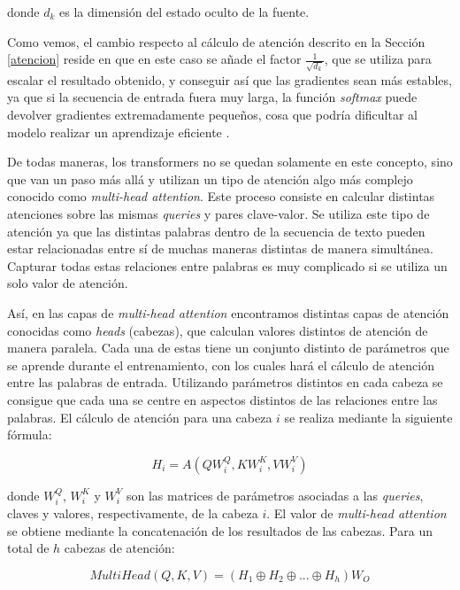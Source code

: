 \documentclass[11pt,spanish,listoffigures,listoftables]{tfgetsinf}
\begin{document}
donde $d_k$ es la dimensión del estado oculto de la fuente.

Como vemos, el cambio respecto al cálculo de atención descrito en la Sección \ref{atencion} reside en que en este caso se añade el factor $\frac{1}{\sqrt{d_k}}$, que se utiliza para escalar el resultado obtenido, y conseguir así que las gradientes sean más estables, ya que si la secuencia de entrada fuera muy larga, la función \textit{softmax} puede devolver gradientes extremadamente pequeños, cosa que podría dificultar al modelo realizar un aprendizaje eficiente \cite{multiheaddotproduct}.

De todas maneras, los transformers no se quedan solamente en este concepto, sino que van un paso más allá y utilizan un tipo de atención algo más complejo conocido como \textit{multi-head attention}. Este proceso consiste en calcular distintas atenciones sobre las mismas \textit{queries} y pares clave-valor. Se utiliza este tipo de atención ya que las distintas palabras dentro de la secuencia de texto pueden estar relacionadas entre sí de muchas maneras distintas de manera simultánea. Capturar todas estas relaciones entre palabras es muy complicado si se utiliza un solo valor de atención.

Así, en las capas de \textit{multi-head attention} encontramos distintas capas de atención conocidas como \textit{heads} (cabezas), que calculan valores distintos de atención de manera paralela. Cada una de estas tiene un conjunto distinto de parámetros que se aprende durante el entrenamiento, con los cuales hará el cálculo de atención entre las palabras de entrada. Utilizando parámetros distintos en cada cabeza se consigue que cada una se centre en aspectos distintos de las relaciones entre las palabras. El cálculo de atención para una cabeza $i$ se realiza mediante la siguiente fórmula:

\begin{equation}
H_i = A(QW_i^Q, KW_i^K, VW_i^V)
\end{equation}

donde $W_i^Q$, $W_i^K$ y $W_i^V$ son las matrices de parámetros asociadas a las \textit{queries}, claves y valores, respectivamente, de la cabeza $i$. El valor de \textit{multi-head attention} se obtiene mediante la concatenación de los resultados de las cabezas. Para un total de $h$ cabezas de atención:

\begin{equation}
MultiHead(Q, K, V) = (H_1 \oplus H_2 \oplus ... \oplus H_h)W_O
\end{equation}
\end{document}
